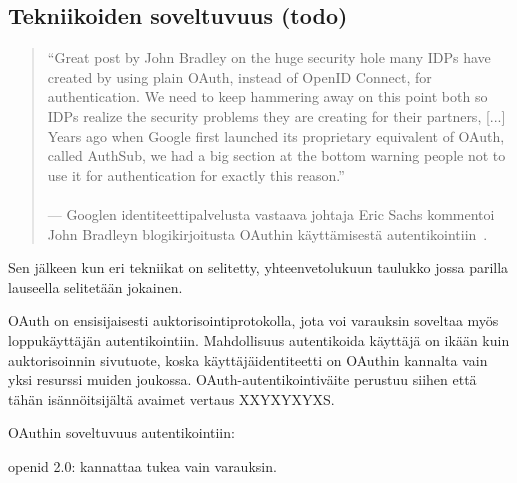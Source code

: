 \documentclass[finnish,gradu]{tktltiki}
\begin{document}
  \subsection{Tekniikoiden soveltuvuus (todo)} %
  \label{sub:tekniikoiden_yhtäläisyydet}

  \begin{quote}
    ``Great post by John Bradley on the huge security hole many IDPs have created by using plain OAuth, instead of OpenID Connect, for authentication. We need to keep hammering away on this point both so IDPs realize the security problems they are creating for their partners, [...] Years ago when Google first launched its proprietary equivalent of OAuth, called AuthSub, we had a big section at the bottom warning people not to use it for authentication for exactly this reason.''
    \\
    \\--- Googlen identiteettipalvelusta vastaava johtaja Eric Sachs
     kommentoi~\cite{sachs_comment_on_oauth_authentication_2012}
     John Bradleyn blogikirjoitusta OAuthin käyttämisestä
     autentikointiin~\cite{bradley_oauth_authentication_problem_2012}.
  \end{quote}

  Sen jälkeen kun eri tekniikat on selitetty, yhteenvetolukuun taulukko jossa parilla lauseella selitetään jokainen.

  OAuth on ensisijaisesti auktorisointiprotokolla, jota voi varauksin soveltaa myös loppukäyttäjän autentikointiin. Mahdollisuus autentikoida käyttäjä on ikään kuin auktorisoinnin sivutuote, koska käyttäjäidentiteetti on OAuthin kannalta vain yksi resurssi muiden joukossa. OAuth-autentikointiväite perustuu siihen että tähän isännöitsijältä avaimet vertaus XXYXYXYXS.

  OAuthin soveltuvuus autentikointiin:

  openid 2.0: kannattaa tukea vain varauksin.
\end{document}
